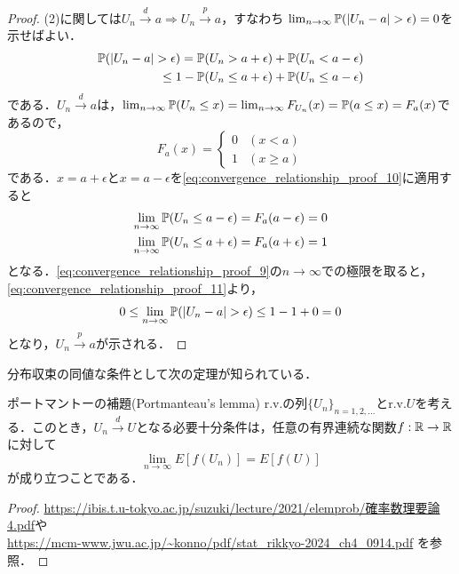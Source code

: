 \documentclass[main.tex]{subfiles}
\begin{document}
\begin{proof}
(2)に関しては$U_n \xrightarrow{d} a \Rightarrow U_n \xrightarrow{p} a$，すなわち $\lim_{n \to \infty} \mathbb{P}(|U_n - a| > \epsilon) = 0$を示せばよい．
\begin{align}
  \mathbb{P}(|U_n - a| > \epsilon) = \mathbb{P}(U_n > a + \epsilon) + \mathbb{P}(U_n < a - \epsilon)  \notag \\
  \leq 1 - \mathbb{P}(U_n \leq a + \epsilon) + \mathbb{P}(U_n \leq a - \epsilon)
  \label{eq:convergence_relationship_proof_9}
\end{align}
である．$U_n \xrightarrow{d} a$は，$\lim_{n \to \infty} \mathbb{P}(U_n \leq x) = \lim_{n \to \infty} F_{U_n} (x) = \mathbb{P}(a \leq x) = F_a(x)$であるので，
\begin{equation}
  F_a(x) = \begin{cases}
    0 & (x < a) \\
    1 & (x \geq a)
  \end{cases}
  \label{eq:convergence_relationship_proof_10}
\end{equation}
である．$x= a + \epsilon$と$x = a - \epsilon$を\eqref{eq:convergence_relationship_proof_10}に適用すると
\begin{equation}
  \begin{split}
    \lim_{n \to \infty} \mathbb{P}(U_n \leq a - \epsilon) = F_a(a - \epsilon) &= 0 \\
    \lim_{n \to \infty} \mathbb{P}(U_n \leq a + \epsilon) = F_a(a + \epsilon) &= 1
  \label{eq:convergence_relationship_proof_11}
  \end{split}
\end{equation}
となる．\eqref{eq:convergence_relationship_proof_9}の$n \to \infty$での極限を取ると，\eqref{eq:convergence_relationship_proof_11}より，
\begin{equation}
  0 \leq \lim_{n \to \infty} \mathbb{P}(|U_n - a| > \epsilon) \leq 1 - 1 + 0 = 0
\end{equation}
となり，$U_n \xrightarrow{p} a$が示される．
\end{proof}

分布収束の同値な条件として次の定理が知られている．
\begin{mytheorem}{ポートマントーの補題(Portmanteau's lemma)}
\label{thm:equivalent_condition_of_convergence_in_distribution} %
r.v.の列$\{U_n\}_{n=1,2,\dots}$とr.v.$U$を考える．このとき，$U_n \xrightarrow{d} U$となる必要十分条件は，任意の有界連続な関数$f: \mathbb{R} \to \mathbb{R}$に対して
\begin{equation}
  \lim_{n \to \infty} E[f(U_n)] = E[f(U)]
\end{equation}
が成り立つことである．
\end{mytheorem}
\begin{proof}
  \href{https://ibis.t.u-tokyo.ac.jp/suzuki/lecture/2021/elemprob/%E7%A2%BA%E7%8E%87%E6%95%B0%E7%90%86%E8%A6%81%E8%AB%964.pdf}{https://ibis.t.u-tokyo.ac.jp/suzuki/lecture/2021/elemprob/確率数理要論4.pdf}や\\
  \url{https://mcm-www.jwu.ac.jp/~konno/pdf/stat_rikkyo-2024_ch4_0914.pdf} を参照．
\end{proof}
\end{document}
